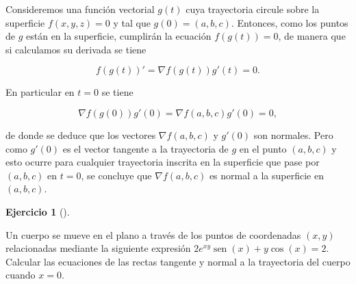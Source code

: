 \documentclass[
  spanish,
  a4paper,
]{scrreport}
\theoremstyle{definition}
\newtheorem{exercise}{Ejercicio}[chapter]
\theoremstyle{remark}
\begin{document}
\begin{tcolorbox}[enhanced jigsaw, arc=.35mm, bottomrule=.15mm, bottomtitle=1mm, breakable, colback=white, colbacktitle=quarto-callout-tip-color!10!white, colframe=quarto-callout-tip-color-frame, coltitle=black, left=2mm, leftrule=.75mm, opacityback=0, opacitybacktitle=0.6, rightrule=.15mm, title=\textcolor{quarto-callout-tip-color}{\faLightbulb}\hspace{0.5em}{Solución}, titlerule=0mm, toprule=.15mm, toptitle=1mm]

Consideremos una función vectorial \(g(t)\) cuya trayectoria circule
sobre la superficie \(f(x,y,z)=0\) y tal que \(g(0)=(a,b,c)\). Entonces,
como los puntos de \(g\) están en la superficie, cumplirán la ecuación
\(f(g(t)) = 0\), de manera que si calculamos su derivada se tiene

\[
f(g(t))' 
= \nabla f(g(t))g'(t)
= 0.
\]

En particular en \(t=0\) se tiene

\[
\nabla f(g(0))g'(0) 
= \nabla f(a,b,c)g'(0) 
= 0,
\]

de donde se deduce que los vectores \(\nabla f(a,b,c)\) y \(g'(0)\) son
normales. Pero como \(g'(0)\) es el vector tangente a la trayectoria de
\(g\) en el punto \((a,b,c)\) y esto ocurre para cualquier trayectoria
inscrita en la superficie que pase por \((a,b,c)\) en \(t=0\), se
concluye que \(\nabla f(a,b,c)\) es normal a la superficie en
\((a,b,c)\).

\end{tcolorbox}

\begin{exercise}[]\protect\hypertarget{exr-derviada-implicita-trayectoria}{}\label{exr-derviada-implicita-trayectoria}

Un cuerpo se mueve en el plano a través de los puntos de coordenadas
\((x,y)\) relacionadas mediante la siguiente expresión
\(2e^{xy} \operatorname{sen}(x) + y\cos(x) = 2\). Calcular las
ecuaciones de las rectas tangente y normal a la trayectoria del cuerpo
cuando \(x=0\).

\end{exercise}
\end{document}
